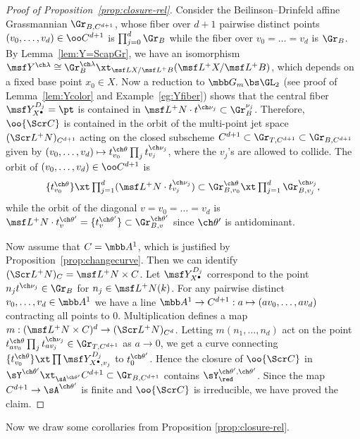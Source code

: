 \begin{proof}[{Proof of Proposition~\ref{prop:closure-rel}}]
Consider the Beilinson--Drinfeld affine Grassmannian $\Gr_{B,C^{d+1}}$,
whose fiber over $d+1$ pairwise distinct points $(v_0,\dotsc, v_d)\in \oo C^{d+1}$
is $\prod_{j=0}^d \Gr_B$ while the fiber over $v_0=\dotsc=v_d$ is $\Gr_B$.
By Lemma~\ref{lem:Y=ScapGr}, we have an isomorphism $\msf Y^{\ch\lambda}\cong \Gr_B^{\ch\lambda}
\xt_{\msf L X/\msf L^+B}(\msf L^+X/\msf L^+B)$,
which depends on a fixed base point $x_0 \in X$.
Now a reduction to $\mbb G_m \bs \GL_2$ (see proof of Lemma~\ref{lem:Ycolor}
and Example~\ref{eg:Yfiber})
shows that the central fiber $\msf Y^{D_j}_{X^\bullet} = \pt$ is contained in
$\msf L^+ N \cdot t^{\ch\nu_j} \subset \Gr_B^{\nu_j}$.
Therefore, $\oo{\Scr C}$ is contained in
the orbit of the multi-point jet space $(\Scr L^+N)_{C^{d+1}}$ acting on
the closed subscheme $C^{d+1}\subset \Gr_{T, C^{d+1}}\subset \Gr_{B,C^{d+1}}$
given by $(v_0,\dotsc, v_d) \mapsto t_{v_0}^{\ch\theta} \prod_j t_{v_j}^{\ch\nu_j}$, where
the $v_j$'s are allowed to collide.
The orbit of $(v_0,\dotsc, v_d) \in \oo C^{d+1}$ is
\[ \textstyle
\{t_{v_0}^{\ch\theta}\} \xt \prod_{j=1}^d (\msf L^+ N \cdot t^{\ch\nu_j}_{v_j})
\subset \Gr_{B,v_0}^{\ch\theta} \xt \prod_{j=1}^d \Gr_{B,v_j}^{\ch\nu_j},
\]
while the orbit of the diagonal $v=v_0=\dotsc=v_d$
is $\msf L^+ N \cdot t^{\ch\theta'}_v = \{ t^{\ch\theta'}_v \} \subset \Gr_{B,v}^{\ch\theta'}$
since $\ch\theta'$ is antidominant.

Now assume that $C=\mbb A^1$, which is justified by Proposition~\ref{prop:changecurve}.
Then we can identify $(\Scr L^+ N)_C = \msf L^+ N \times C$.
Let $\msf Y^{D_j}_{X^\bullet}$ correspond to the point $n_j t^{\ch\nu_j}\in \Gr_B$
for $n_j \in \msf L^+N(k)$.
For any pairwise distinct $v_0,\dotsc, v_d \in \mbb A^1$ we have
a line $\mbb A^1 \to C^{d+1} : a \mapsto (a v_0, \dotsc, a v_d)$ contracting all points to $0$.
Multiplication defines a map
$m: (\msf L^+ N \times C)^d \to (\Scr L^+ N)_{C^d}$.
Letting $m(n_1,\dotsc,n_d)$ act
on the point $t_{a v_0}^{\ch\theta} \prod_j t_{a v_j}^{\ch\nu_j}
\in \Gr_{T,C^{d+1}}$ as $a\to 0$,
we get a curve connecting $\{ t^{\ch\theta}_{v_0} \} \xt \prod \msf Y^{D_j}_{X^\bullet,v_j}$ to
$t^{\ch\theta'}_0$.
Hence the closure of $\oo{\Scr C}$
in $\sY^{\ch\theta'} \xt_{\sA^{\ch\theta'}} C^{d+1} \subset \Gr_{B,C^{d+1}}$ contains $\sY^{\ch\theta',\ch\theta'}_\red$.
Since the map $C^{d+1} \to \sA^{\ch\theta'}$ is finite and $\oo{\Scr C}$ is irreducible,
we have proved the claim.
\end{proof}

Now we draw some corollaries from Proposition \ref{prop:closure-rel}.


